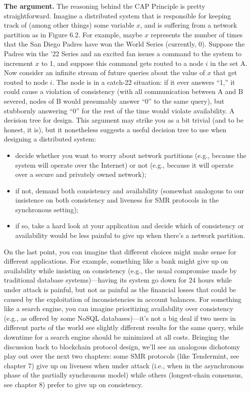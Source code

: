 \textbf{The argument.} The reasoning behind the CAP Principle is pretty straightforward. Imagine a distributed system that is responsible for keeping track of (among other things) some variable $x$, and is suffering from a network partition as in Figure 6.2. For example, maybe
$x$ represents the number of times that the San Diego Padres have won the World Series
(currently, 0). Suppose the Padres win the ’22 Series and an excited fan issues a command
to the system to increment $x$ to 1, and suppose this command gets routed to a node $i$ in
the set A. Now consider an infinite stream of future queries about the value of $x$  that get
routed to node $i$. The node is in a catch-22 situation: if it ever answers “1,” it could cause
a violation of consistency (with all communication between A and B severed, nodes of B
would presumably answer “0” to the same query), but stubbornly answering “0” for the rest
of the time would violate availability.
A decision tree for design. This argument may strike you as a bit trivial (and to be
honest, it is), but it nonetheless suggests a useful decision tree to use when designing a
distributed system:
\begin{itemize}
    \item decide whether you want to worry about network partitions (e.g., because the system
will operate over the Internet) or not (e.g., because it will operate over a secure and
privately owned network);
    \item if not, demand both consistency and availability (somewhat analogous to our insistence
on both consistency and liveness for SMR protocols in the synchronous setting);
    \item if so, take a hard look at your application and decide which of consistency or availability
would be less painful to give up when there’s a network partition.

\end{itemize}
On the last point, you can imagine that different choices might make sense for different applications. For example, something like a bank might give up on availability while insisting
on consistency (e.g., the usual compromise made by traditional database systems)—having
its system go down for 24 hours while under attack is painful, but not as painful as the financial losses that could be caused by the exploitation of inconsistencies in account balances.
For something like a search engine, you can imagine prioritizing availability over consistency
(e.g., as offered by some NoSQL databases)—it’s not a big deal if two users in different parts
of the world see slightly different results for the same query, while downtime for a search
engine should be minimized at all costs.
Bringing the discussion back to blockchain protocol design, we’ll see an analogous dichotomy play out over the next two chapters: some SMR protocols (like Tendermint, see
chapter 7) give up on liveness when under attack (i.e., when in the asynchronous phase of
the partially synchronous model) while others (longest-chain consensus, see chapter 8) prefer
to give up on consistency.


